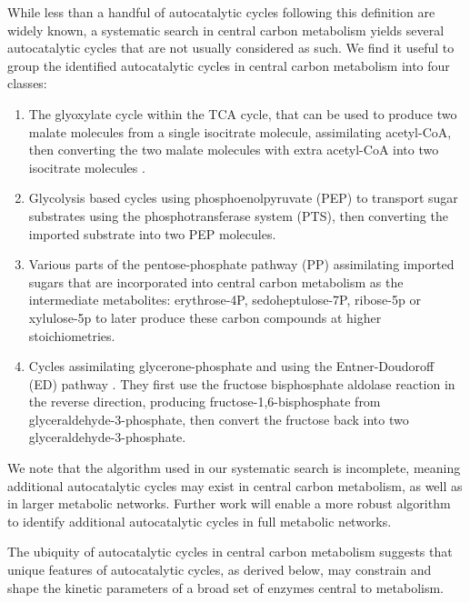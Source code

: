 While less than a handful of autocatalytic cycles following this definition are widely known, a systematic search in central carbon metabolism yields several autocatalytic cycles that are not usually considered as such.
We find it useful to group the identified autocatalytic cycles in central carbon metabolism into four classes:
\begin{enumerate}
    \item The glyoxylate cycle within the TCA cycle, that can be used to produce two malate molecules from a single isocitrate molecule, assimilating acetyl-CoA, then converting the two malate molecules with extra acetyl-CoA into two isocitrate molecules \cite{Kornberg1966-lh}.
    \item Glycolysis based cycles using phosphoenolpyruvate (PEP) to transport sugar substrates using the phosphotransferase system (PTS), then converting the imported substrate into two PEP molecules.
    \item Various parts of the pentose-phosphate pathway (PP) assimilating imported sugars that are incorporated into central carbon metabolism as the intermediate metabolites: erythrose-4P, sedoheptulose-7P, ribose-5p or xylulose-5p to later produce these carbon compounds at higher stoichiometries.
    \item Cycles assimilating glycerone-phosphate and using the Entner-Doudoroff (ED) pathway \cite{Entner1952-xs}.
        They first use the fructose bisphosphate aldolase reaction in the reverse direction, producing fructose-1,6-bisphosphate from glyceraldehyde-3-phosphate, then convert the fructose back into two glyceraldehyde-3-phosphate.
\end{enumerate}

We note that the algorithm used in our systematic search is incomplete, meaning additional autocatalytic cycles may exist in central carbon metabolism, as well as in larger metabolic networks.
Further work will enable a more robust algorithm to identify additional autocatalytic cycles in full metabolic networks.

The ubiquity of autocatalytic cycles in central carbon metabolism suggests that unique features of autocatalytic cycles, as derived below, may constrain and shape the kinetic parameters of a broad set of enzymes central to metabolism.

